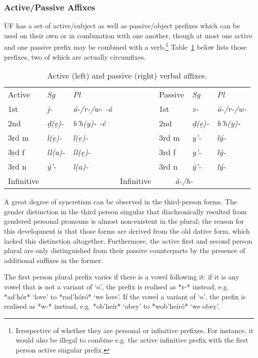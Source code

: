 \documentclass[a4paper, 12pt, oneside, final]{article}
\let \nf \normalfont
\def \d {ḍ}
\def \e {ẹ}
\begin{document}
\subsubsection{Active/Passive Affixes}\label{subsubsec:active-passive-affixes}
UF has a set of active/subject as well as passive/object prefixes which can be used on their own or in combination
with one another, though at most one active and one passive prefix may be combined with a verb.\footnote{Irrespective
of whether they are personal or infinitive prefixes. For instance, it would also be illegal to combine e.g. the active
infinitive prefix with the first person active singular prefix.} Table~\ref{tab:active-passive-prefixes}
below lists those prefixes, two of which are actually circumfixes.

\begin{table}[h]
\centering
\noindent\begin{tabular}{@{}|>{}l|>{\it}l|>{\it}l|>{}l|>{}l|>{\it}l|>{\it}l|}\cline{1-3}\cline{5-7}
 Active&\nf Sg&\nf Pl& & Passive&\nf Sg&\nf Pl\\\cline{1-3}\cline{5-7}
1st&j-&ó-/r-/w- -ó&&1st&v-&ó-/r-/w-\\\cline{1-3}\cline{5-7}
2nd&\d{}(\e)-&b’h(y)- -é&&2nd&\d{}(\e)-&b’h(y)-\\\cline{1-3}\cline{5-7}
3rd m&l(\e)-&l(\e)-&&3rd m&y’-&lý-\\\cline{1-3}\cline{5-7}
3rd f&ll(a)-&ll(\e)-&&3rd f&y’- &lý-\\\cline{1-3}\cline{5-7}
3rd n&ý’- &l(a)-&&3rd n&ý’-&lý-\\\cline{1-3}\cline{5-7}
Infinitive&\multicolumn{2}{c|}{\it d(\e)-}&&Infinitive&\multicolumn{2}{c|}{\it à-/h-}\\\cline{1-3}\cline{5-7}
\end{tabular}
\caption{Active (left) and passive (right) verbal affixes.}\label{tab:active-passive-prefixes}
\end{table}

\noindent A great degree of syncretism can be observed in the third-person forms. The gender distinction in the
third person singular that diachronically resulted from gendered personal pronouns is almost non-existent in the
plural; the reason for this development is that those forms are derived from the old dative form, which lacked
this distinction altogether.
Furthermore, the active first and second person plural are only distinguished from their passive counterparts by
the presence of additional suffixes in the former.

The first person plural prefix varies if there is a vowel following it: if it is
any vowel that is not a variant of ‘o’, the prefix is realised as *r-* instead, e.g. *ad’hór* ‘love’ to
*rad’hóró* ‘we love’. If the vowel a variant of ‘o’, the prefix is realised as *w-* instead, e.g. *ob’heír* ‘obey’
to *wob’heíró* ‘we obey’.
\end{document}
